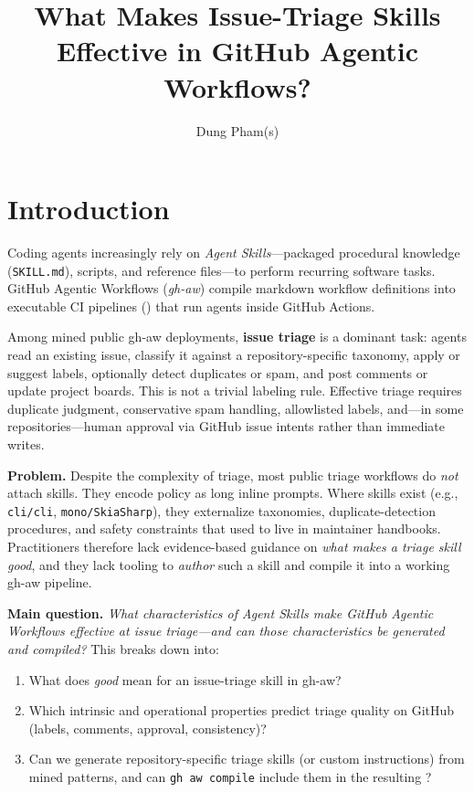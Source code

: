 \documentclass[sigconf,review,anonymous]{acmart}
\title{What Makes Issue-Triage Skills Effective in GitHub Agentic Workflows?}
\author{Dung Pham(s)}
\affiliation{%
  \institution{Trent University}
  \city{Peterborough}
  \country{Canada}}
\newcommand{\filepath}[1]{{\path{#1}}}
\begin{document}
\maketitle

\section{Introduction}
\label{sec:introduction}

Coding agents increasingly rely on \emph{Agent Skills}---packaged procedural knowledge
(\texttt{SKILL.md}), scripts, and reference files---to perform recurring software tasks.
GitHub Agentic Workflows (\emph{gh-aw}) compile markdown workflow definitions into
executable CI pipelines (\filepath{.lock.yml}) that run agents inside GitHub Actions.

Among mined public gh-aw deployments, \textbf{issue triage} is a dominant task:
agents read an existing issue, classify it against a repository-specific taxonomy,
apply or suggest labels, optionally detect duplicates or spam, and post comments or
update project boards.
This is not a trivial labeling rule.
Effective triage requires duplicate judgment, conservative spam handling, allowlisted
labels, and---in some repositories---human approval via GitHub issue intents rather
than immediate writes.

\textbf{Problem.}
Despite the complexity of triage, most public triage workflows do \emph{not} attach
skills.
They encode policy as long inline prompts.
Where skills exist (e.g., \texttt{cli/cli}, \texttt{mono/SkiaSharp}), they externalize
taxonomies, duplicate-detection procedures, and safety constraints that used to live
in maintainer handbooks.
Practitioners therefore lack evidence-based guidance on \emph{what makes a triage
skill good}, and they lack tooling to \emph{author} such a skill and compile it into
a working gh-aw pipeline.

\textbf{Main question.}
\emph{What characteristics of Agent Skills make GitHub Agentic Workflows effective
at issue triage---and can those characteristics be generated and compiled?}
This breaks down into:
\begin{enumerate}
  \item What does \emph{good} mean for an issue-triage skill in gh-aw?
  \item Which intrinsic and operational properties predict triage quality on GitHub
        (labels, comments, approval, consistency)?
  \item Can we generate repository-specific triage skills (or custom instructions)
        from mined patterns, and can \texttt{gh aw compile} include them in the
        resulting \filepath{.lock.yml}?
\end{enumerate}
\end{document}
